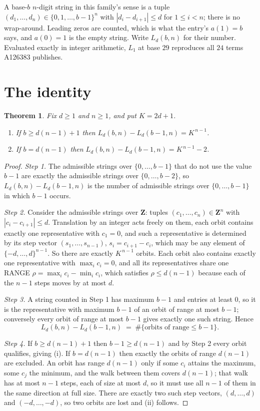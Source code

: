 \documentclass[11pt,a4paper]{article}
\theoremstyle{plain}
\newtheorem{theorem}{Theorem}
\theoremstyle{definition}
\begin{document}
A base-$b$ $n$-digit string in this family's sense is a tuple
$(d_1,\dots,d_n)\in\{0,1,\dots,b-1\}^{n}$ with $|d_i-d_{i+1}|\le d$ for $1\le i<n$; there
is no wrap-around. Leading zeros are counted, which is what the entry's $a(1)=b$ says, and
$a(0)=1$ is the empty string. Write $L_d(b,n)$ for their number. Evaluated exactly in integer
arithmetic, $L_{1}$ at base $29$ reproduces all $24$ terms A126383 publishes.

\section{The identity}

\begin{theorem}
Fix $d\ge1$ and $n\ge1$, and put $K=2d+1$.
\begin{enumerate}
\item[(i)] If $b\ge d(n-1)+1$ then $L_d(b,n)-L_d(b-1,n)=K^{\,n-1}$.
\item[(ii)] If $b=d(n-1)$ then $L_d(b,n)-L_d(b-1,n)=K^{\,n-1}-2$.
\end{enumerate}
\end{theorem}

\begin{proof}
\emph{Step 1.} The admissible strings over $\{0,\dots,b-1\}$ that do not use the value $b-1$
are exactly the admissible strings over $\{0,\dots,b-2\}$, so $L_d(b,n)-L_d(b-1,n)$ is the
number of admissible strings over $\{0,\dots,b-1\}$ in which $b-1$ occurs.

\emph{Step 2.} Consider the admissible strings over $\mathbf{Z}$: tuples
$(c_1,\dots,c_n)\in\mathbf{Z}^{n}$ with $|c_i-c_{i+1}|\le d$. Translation by an integer acts
freely on them, each orbit contains exactly one representative with $c_1=0$, and such a
representative is determined by its step vector $(s_1,\dots,s_{n-1})$, $s_i=c_{i+1}-c_i$,
which may be any element of $\{-d,\dots,d\}^{n-1}$. So there are exactly $K^{\,n-1}$ orbits.
Each orbit also contains exactly one representative with $\max_i c_i=0$, and all its
representatives share one RANGE $\rho=\max_ic_i-\min_ic_i$, which satisfies
$\rho\le d(n-1)$ because each of the $n-1$ steps moves by at most $d$.

\emph{Step 3.} A string counted in Step 1 has maximum $b-1$ and entries at least $0$, so it is
the representative with maximum $b-1$ of an orbit of range at most $b-1$; conversely every orbit
of range at most $b-1$ gives exactly one such string. Hence
\[
L_d(b,n)-L_d(b-1,n)\;=\;\#\{\text{orbits of range}\le b-1\} .
\]

\emph{Step 4.} If $b\ge d(n-1)+1$ then $b-1\ge d(n-1)$ and by Step 2 every orbit qualifies,
giving (i). If $b=d(n-1)$ then exactly the orbits of range $d(n-1)$ are excluded. An orbit has
range $d(n-1)$ only if some $c_i$ attains the maximum, some $c_j$ the minimum, and the walk
between them covers $d(n-1)$; that walk has at most $n-1$ steps, each of size at most $d$, so it
must use all $n-1$ of them in the same direction at full size. There are exactly two such step
vectors, $(d,\dots,d)$ and $(-d,\dots,-d)$, so two orbits are lost and (ii) follows.
\end{proof}
\end{document}
